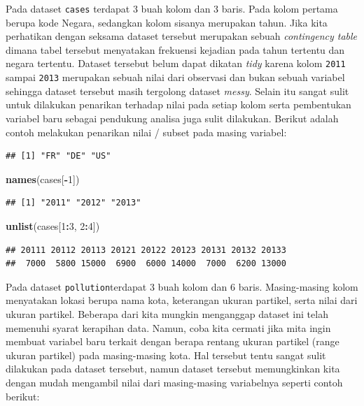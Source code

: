 \documentclass[]{book}
\newenvironment{Shaded}{\begin{snugshade}}{\end{snugshade}}
\newcommand{\KeywordTok}[1]{\textcolor[rgb]{0.13,0.29,0.53}{\textbf{#1}}}
\newcommand{\DecValTok}[1]{\textcolor[rgb]{0.00,0.00,0.81}{#1}}
\newcommand{\OperatorTok}[1]{\textcolor[rgb]{0.81,0.36,0.00}{\textbf{#1}}}
\newcommand{\NormalTok}[1]{#1}
\begin{document}
Pada dataset \texttt{cases} terdapat 3 buah kolom dan 3 baris. Pada
kolom pertama berupa kode Negara, sedangkan kolom sisanya merupakan
tahun. Jika kita perhatikan dengan seksama dataset tersebut merupakan
sebuah \emph{contingency table} dimana tabel tersebut menyatakan
frekuensi kejadian pada tahun tertentu dan negara tertentu. Dataset
tersebut belum dapat dikatan \emph{tidy} karena kolom \texttt{2011}
sampai \texttt{2013} merupakan sebuah nilai dari observasi dan bukan
sebuah variabel sehingga dataset tersebut masih tergolong dataset
\emph{messy}. Selain itu sangat sulit untuk dilakukan penarikan terhadap
nilai pada setiap kolom serta pembentukan variabel baru sebagai
pendukung analisa juga sulit dilakukan. Berikut adalah contoh melakukan
penarikan nilai / subset pada masing variabel:

\begin{Shaded}
\end{Shaded}

\begin{verbatim}
## [1] "FR" "DE" "US"
\end{verbatim}

\begin{Shaded}
\begin{Highlighting}[]
\KeywordTok{names}\NormalTok{(cases[}\OperatorTok{-}\DecValTok{1}\NormalTok{])}
\end{Highlighting}
\end{Shaded}

\begin{verbatim}
## [1] "2011" "2012" "2013"
\end{verbatim}

\begin{Shaded}
\begin{Highlighting}[]
\KeywordTok{unlist}\NormalTok{(cases[}\DecValTok{1}\OperatorTok{:}\DecValTok{3}\NormalTok{, }\DecValTok{2}\OperatorTok{:}\DecValTok{4}\NormalTok{])}
\end{Highlighting}
\end{Shaded}

\begin{verbatim}
## 20111 20112 20113 20121 20122 20123 20131 20132 20133 
##  7000  5800 15000  6900  6000 14000  7000  6200 13000
\end{verbatim}

Pada dataset \texttt{pollution}terdapat 3 buah kolom dan 6 baris.
Masing-masing kolom menyatakan lokasi berupa nama kota, keterangan
ukuran partikel, serta nilai dari ukuran partikel. Beberapa dari kita
mungkin menganggap dataset ini telah memenuhi syarat kerapihan data.
Namun, coba kita cermati jika mita ingin membuat variabel baru terkait
dengan berapa rentang ukuran partikel (range ukuran partikel) pada
masing-masing kota. Hal tersebut tentu sangat sulit dilakukan pada
dataset tersebut, namun dataset tersebut memungkinkan kita dengan mudah
mengambil nilai dari masing-masing variabelnya seperti contoh berikut:
\end{document}

